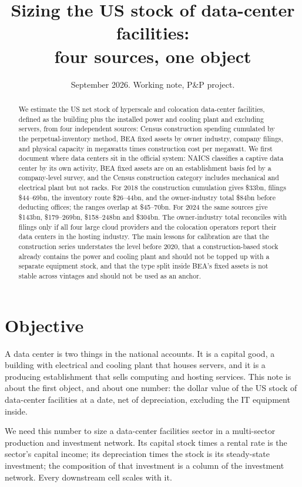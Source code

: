 \documentclass[11pt]{article}
\title{Sizing the US stock of data-center facilities:\\ four sources, one object}
\author{}
\date{September 2026. Working note, P\&P project.}
\begin{document}
\maketitle

\begin{abstract}
\noindent We estimate the US net stock of hyperscale and colocation data-center facilities, defined as the building plus the installed power and cooling plant and excluding servers, from four independent sources: Census construction spending cumulated by the perpetual-inventory method, BEA fixed assets by owner industry, company filings, and physical capacity in megawatts times construction cost per megawatt. We first document where data centers sit in the official system: NAICS classifies a captive data center by its own activity, BEA fixed assets are on an establishment basis fed by a company-level survey, and the Census construction category includes mechanical and electrical plant but not racks. For 2018 the construction cumulation gives \$33bn, filings \$44--69bn, the inventory route \$26--44bn, and the owner-industry total \$84bn before deducting offices; the ranges overlap at \$45--70bn. For 2024 the same sources give \$143bn, \$179--269bn, \$158--248bn and \$304bn. The owner-industry total reconciles with filings only if all four large cloud providers and the colocation operators report their data centers in the hosting industry. The main lessons for calibration are that the construction series understates the level before 2020, that a construction-based stock already contains the power and cooling plant and should not be topped up with a separate equipment stock, and that the type split inside BEA's fixed assets is not stable across vintages and should not be used as an anchor.
\end{abstract}

\section{Objective}

A data center is two things in the national accounts. It is a capital good, a building with electrical and cooling plant that houses servers, and it is a producing establishment that sells computing and hosting services. This note is about the first object, and about one number: the dollar value of the US stock of data-center facilities at a date, net of depreciation, excluding the IT equipment inside.

We need this number to size a data-center facilities sector in a multi-sector production and investment network. Its capital stock times a rental rate is the sector's capital income; its depreciation times the stock is its steady-state investment; the composition of that investment is a column of the investment network. Every downstream cell scales with it.
\end{document}
